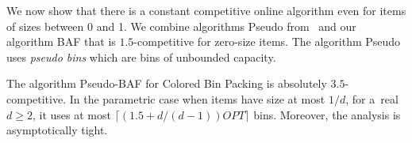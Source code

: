 \documentclass[11pt,a4paper]{article}
\def\vari#1{\mathit{#1}}
\begin{document}
We now show that there is a constant competitive online algorithm even for items of sizes between 0 and 1.
We combine algorithms Pseudo from~\cite{balogh14} and our algorithm BAF that is $1.5$-competitive for zero-size items.
The algorithm Pseudo uses \textit{pseudo bins} which are bins of unbounded capacity.

\begin{center}
\end{center}

\begin{theorem}
\label{thm:PseudoBAF}
The algorithm Pseudo-BAF for Colored Bin Packing is absolutely
$3.5$-com\-pe\-ti\-ti\-ve. In the parametric case when items have size
at most $1/d$, for a~real $d \geq 2$, it uses at most $\lceil (1.5 +
d/(d-1))\vari{OPT}\rceil$ bins. Moreover, the analysis is
asymptotically tight.
\end{theorem}
\end{document}

